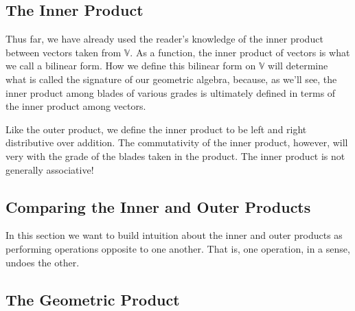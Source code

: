 \documentclass[12pt]{article}
\newcommand{\V}{\mathbb{V}}
\newtheorem{definition}{Definition}[section]
\begin{document}
\subsection{The Inner Product}

Thus far, we have already used the reader's knowledge of the inner product
between vectors taken from $\V$.  As a function, the inner product of vectors is
what we call a bilinear form.  How we define this bilinear form on $\V$ will determine
what is called the signature of our geometric algebra, because, as we'll see,
the inner product among blades of various grades is ultimately defined
in terms of the inner product among vectors.

Like the outer product, we define the inner product to be left and
right distributive over addition.  The commutativity of the inner
product, however, will very with the grade of the blades taken
in the product.  The inner product is not generally associative!


\subsection{Comparing the Inner and Outer Products}

In this section we want to build intuition about the inner and
outer products as performing operations opposite to one another.
That is, one operation, in a sense, undoes the other.
%

\subsection{The Geometric Product}





\end{document}
